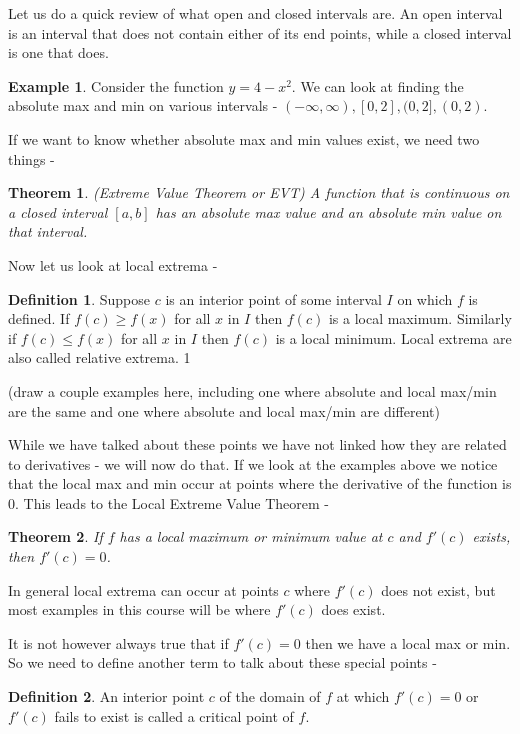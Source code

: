 \documentclass[12pt,reqno]{article}
\newtheorem{Theorem}{Theorem}
\theoremstyle{definition}
\newtheorem*{Definition}{Definition}
\newtheorem*{Example}{Example}
\begin{document}
Let us do a quick review of what open and closed intervals are. An open interval is an interval that does not contain either of its end points, while a closed interval is one that does. 
\begin{Example}
	Consider the function $y = 4 - x^2$. We can look at finding the absolute max and min on various intervals - $(-\infty, \infty), [0, 2], (0, 2], (0, 2)$. 
\end{Example}

If we want to know whether absolute max and min values exist, we need two things - 
\begin{Theorem}
	(Extreme Value Theorem or EVT) A function that is continuous on a closed interval $[a, b]$ has an absolute max value and an absolute min value on that interval. 
\end{Theorem}

Now let us look at local extrema - 
\begin{Definition}
	Suppose $c$ is an interior point of some interval $I$ on which $f$ is defined. If $f(c) \geq f(x)$ for all $x$ in $I$ then $f(c)$ is a local maximum. Similarly if $f(c) \leq f(x)$ for all $x$ in $I$ then $f(c)$ is a local minimum. Local extrema are also called relative extrema. 1
\end{Definition}

(draw a couple examples here, including one where absolute and local max/min are the same and one where absolute and local max/min are different)

While we have talked about these points we have not linked how they are related to derivatives - we will now do that. If we look at the examples above we notice that the local max and min occur at points where the derivative of the function is 0. This leads to the Local Extreme Value Theorem - 
\begin{Theorem}
	If $f$ has a local maximum or minimum value at $c$ and $f'(c)$ exists, then $f'(c) = 0$. 
\end{Theorem}

In general local extrema can occur at points $c$ where  $f'(c)$ does not exist, but most examples in this course will be where $f'(c)$ does exist. 

It is not however always true that if $f'(c) = 0$ then we have a local max or min. So we need to define another term to talk about these special points - 
\begin{Definition}
	An interior point $c$ of the domain of $f$ at which $f'(c) = 0$ or $f'(c)$ fails to exist is called a critical point of $f$. 
\end{Definition}
\end{document}
